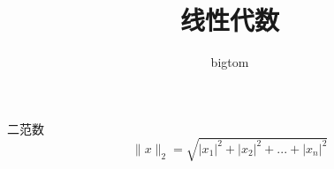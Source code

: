 \documentclass{article}
\begin{document}
\title{线性代数}
\author{bigtom}
\maketitle
二范数
$$\|x\|_2=\sqrt{|x_1|^2+|x_2|^2+...+|x_n|^2}$$
\end{document}
